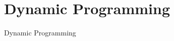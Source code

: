 \section{Dynamic Programming}

\begin{frame}{}
  \Large
  \centering
  \color{bleu}
  Dynamic Programming
\end{frame}